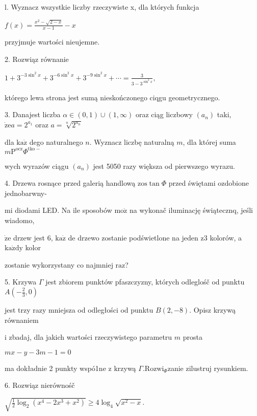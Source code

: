 \documentclass[a4paper,12pt]{article}
\begin{document}
l. Wyznacz wszystkie liczby rzeczywiste x, dla których funkcja

$f(x)=\displaystyle \frac{x^{2}-\sqrt{2-x}}{x-1}-x$

przyjmuje wartości nieujemne.

2. Rozwiąz równanie

$1+3^{-3\sin^{2}x}+3^{-6\sin^{2}x}+3^{-9\sin^{2}x}+\displaystyle \cdots=\frac{3}{3-3^{\sin^{2}x}},$

którego lewa strona jest sumą nieskończonego ciqgu geometrycznego.

3. Danajest liczba $\alpha\in(0,1)\cup(1,\infty)$ oraz ciąg liczbowy $(a_{n})$ taki, $\dot{\mathrm{z}}\mathrm{e}a=2^{a_{1}}$ oraz $a= \sqrt[n]{2^{a_{n}}}$

dla $\mathrm{k}\mathrm{a}\dot{\mathrm{z}}$ dego naturalnego $n$. Wyznacz liczbę naturalną $m$, dla której suma $m\mathrm{P}^{\mathrm{o}\mathrm{c}\mathrm{z}}\Phi^{\mathrm{t}\mathrm{k}\mathrm{o}-}$

wych wyrazów ciągu $(a_{n})$ jest 5050 razy większa od pierwszego wyrazu.

4. Drzewa rosnące przed galerią handlową $\mathrm{z}\mathrm{o}\mathrm{s}\tan\Phi$ przed świętami ozdobione jednobarwny-

mi diodami LED. Na ile sposobów $\mathrm{m}\mathrm{o}\dot{\mathrm{z}}$ na wykonač iluminację świątecznq, jeśli wiadomo,

$\dot{\mathrm{z}}\mathrm{e}$ drzew jest 6, $\mathrm{k}\mathrm{a}\dot{\mathrm{z}}$ de drzewo zostanie podświetlone na jeden $\mathrm{z}3$ kolorów, a $\mathrm{k}\mathrm{a}\dot{\mathrm{z}}\mathrm{d}\mathrm{y}$ kolor

zostanie wykorzystany co najmniej $\mathrm{r}\mathrm{a}\mathrm{z}$?

5. Krzywa $\Gamma$ jest zbiorem punktów pfaszczyzny, których odleglośč od punktu $A(-\displaystyle \frac{2}{3},0)$

jest trzy razy mniejsza od odległości od punktu $B(2,-8)$. Opisz krzywą równaniem

$\mathrm{i}$ zbadaj, dla jakich wartości rzeczywistego parametru $m$ prosta

$mx-y-3m-1=0$

ma dokładnie 2 punkty wspó1ne $\mathrm{z}$ krzywą $\Gamma. \mathrm{R}\mathrm{o}\mathrm{z}\mathrm{w}\mathrm{i}_{\Phi}$zanie zilustruj rysunkiem.

6. Rozwiąz nierównośč

$\sqrt{\frac{1}{2}\log_{2}(x^{4}-2x^{3}+x^{2})}\geq 4\log_{4}\sqrt{x^{2}-x}.$
\end{document}
